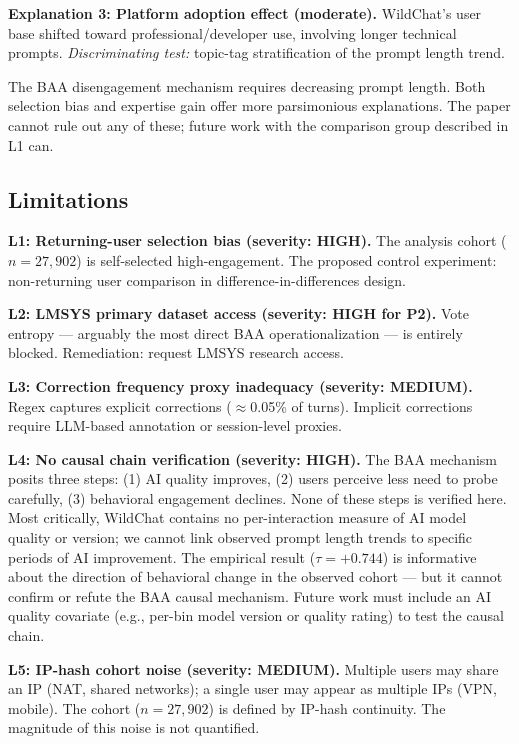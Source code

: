 \textbf{Explanation 3: Platform adoption effect (moderate).} WildChat's user base shifted toward professional/developer use, involving longer technical prompts. \emph{Discriminating test:} topic-tag stratification of the prompt length trend.

The BAA disengagement mechanism requires decreasing prompt length. Both selection bias and expertise gain offer more parsimonious explanations. The paper cannot rule out any of these; future work with the comparison group described in L1 can.

\subsection{Limitations}
\label{sec:limitations}

\textbf{L1: Returning-user selection bias (severity: HIGH).} The analysis cohort ($n = 27{,}902$) is self-selected high-engagement. The proposed control experiment: non-returning user comparison in difference-in-differences design.

\textbf{L2: LMSYS primary dataset access (severity: HIGH for P2).} Vote entropy --- arguably the most direct BAA operationalization --- is entirely blocked. Remediation: request LMSYS research access.

\textbf{L3: Correction frequency proxy inadequacy (severity: MEDIUM).} Regex captures explicit corrections ($\approx$0.05\% of turns). Implicit corrections require LLM-based annotation or session-level proxies.

\textbf{L4: No causal chain verification (severity: HIGH).} The BAA mechanism posits three steps: (1) AI quality improves, (2) users perceive less need to probe carefully, (3) behavioral engagement declines. None of these steps is verified here. Most critically, WildChat contains no per-interaction measure of AI model quality or version; we cannot link observed prompt length trends to specific periods of AI improvement. The empirical result ($\tau = +0.744$) is informative about the direction of behavioral change in the observed cohort --- but it cannot confirm or refute the BAA causal mechanism. Future work must include an AI quality covariate (e.g., per-bin model version or quality rating) to test the causal chain.

\textbf{L5: IP-hash cohort noise (severity: MEDIUM).} Multiple users may share an IP (NAT, shared networks); a single user may appear as multiple IPs (VPN, mobile). The cohort ($n = 27{,}902$) is defined by IP-hash continuity. The magnitude of this noise is not quantified.


